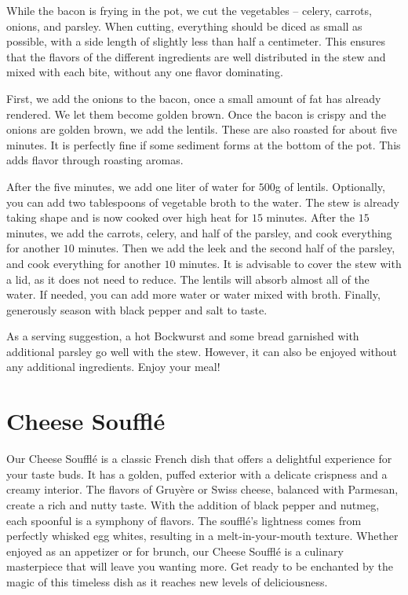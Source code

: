 While the bacon is frying in the pot, we cut the vegetables -- celery, carrots, onions, and parsley. When cutting, everything should be diced as small as possible, with a side length of slightly less than half a centimeter. This ensures that the flavors of the different ingredients are well distributed in the stew and mixed with each bite, without any one flavor dominating.

First, we add the onions to the bacon, once a small amount of fat has already rendered. We let them become golden brown. Once the bacon is crispy and the onions are golden brown, we add the lentils. These are also roasted for about five minutes. It is perfectly fine if some sediment forms at the bottom of the pot. This adds flavor through roasting aromas.

After the five minutes, we add one liter of water for $500$g of lentils. Optionally, you can add two tablespoons of vegetable broth to the water. The stew is already taking shape and is now cooked over high heat for $15$ minutes. After the $15$ minutes, we add the carrots, celery, and half of the parsley, and cook everything for another $10$ minutes. Then we add the leek and the second half of the parsley, and cook everything for another $10$ minutes. It is advisable to cover the stew with a lid, as it does not need to reduce. The lentils will absorb almost all of the water. If needed, you can add more water or water mixed with broth. Finally, generously season with black pepper and salt to taste.

As a serving suggestion, a hot Bockwurst and some bread garnished with additional parsley go well with the stew. However, it can also be enjoyed without any additional ingredients. Enjoy your meal!

\section{Cheese Soufflé}
\label{cheesesouffle}
Our Cheese Soufflé is a classic French dish that offers a delightful experience for your taste buds. It has a golden, puffed exterior with a delicate crispness and a creamy interior. The flavors of Gruyère or Swiss cheese, balanced with Parmesan, create a rich and nutty taste. With the addition of black pepper and nutmeg, each spoonful is a symphony of flavors. The soufflé's lightness comes from perfectly whisked egg whites, resulting in a melt-in-your-mouth texture. Whether enjoyed as an appetizer or for brunch, our Cheese Soufflé is a culinary masterpiece that will leave you wanting more. Get ready to be enchanted by the magic of this timeless dish as it reaches new levels of deliciousness.

